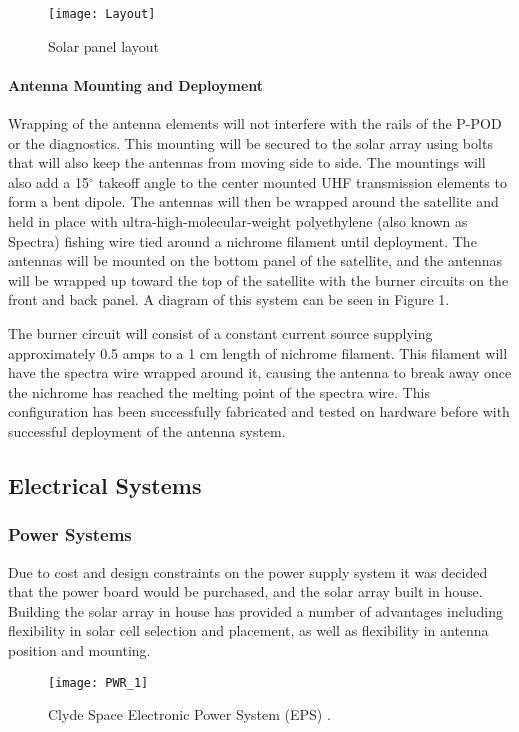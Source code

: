 \documentclass[nocover]            %
{CSLI}                       %
\begin{document}
\begin{figure}[H]

    \texttt{[image: Layout]}
    \caption{Solar panel layout}
\end{figure}

\paragraph{Antenna Mounting and Deployment\\}
Wrapping of the antenna elements will not interfere with the rails of the P-POD or the diagnostics. This mounting will be secured to the solar array using bolts that will also keep the antennas from moving side to side. The mountings will also add a 15$^\circ$ takeoff angle to the center mounted UHF transmission elements to form a bent dipole. The antennas will then be wrapped around the satellite and held in place with ultra-high-molecular-weight polyethylene (also known as Spectra) fishing wire tied around a nichrome filament until deployment. The antennas will be mounted on the bottom panel of the satellite, and the antennas will be wrapped up toward the top of the satellite with the burner circuits on the front and back panel. A diagram of this system can be seen in Figure 1.

The burner circuit will consist of a constant current source supplying approximately 0.5 amps to a 1 cm length of nichrome filament. This filament will have the spectra wire wrapped around it, causing the antenna to break away once the nichrome has reached the melting point of the spectra wire. This configuration has been successfully fabricated and tested on hardware before with successful deployment of the antenna system.

\subsection{Electrical Systems}
\subsubsection{Power Systems}
Due to cost and design constraints on the power supply system it was decided that the power board would be purchased, and the solar array built in house. Building the solar array in house has provided a number of advantages including flexibility in solar cell selection and placement, as well as flexibility in antenna position and mounting.


\begin{figure}[H]
\centering
    \texttt{[image: PWR\_1]}
    \caption{Clyde Space Electronic Power System (EPS) \cite{Clyde Space}.}
\end{figure}
\end{document}
